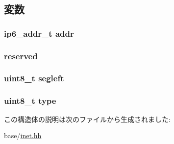 \subsection{変数}
\hypertarget{structNet_1_1ip6__opt__routing__type2_ae32b25ff633168fbdecd8d24293034cd}{
\subsubsection[{addr}]{\setlength{\rightskip}{0pt plus 5cm}ip6\_\-addr\_\-t {\bf addr}}}
\label{structNet_1_1ip6__opt__routing__type2_ae32b25ff633168fbdecd8d24293034cd}
\hypertarget{structNet_1_1ip6__opt__routing__type2_aa43c4c21b173ada1b6b7568956f0d650}{
\subsubsection[{reserved}]{ {\bf reserved}}}
\label{structNet_1_1ip6__opt__routing__type2_aa43c4c21b173ada1b6b7568956f0d650}
\hypertarget{structNet_1_1ip6__opt__routing__type2_adb2cddb552828de64405e671146d80a9}{
\subsubsection[{segleft}]{\setlength{\rightskip}{0pt plus 5cm}uint8\_\-t {\bf segleft}}}
\label{structNet_1_1ip6__opt__routing__type2_adb2cddb552828de64405e671146d80a9}
\hypertarget{structNet_1_1ip6__opt__routing__type2_a1d127017fb298b889f4ba24752d08b8e}{
\subsubsection[{type}]{\setlength{\rightskip}{0pt plus 5cm}uint8\_\-t {\bf type}}}
\label{structNet_1_1ip6__opt__routing__type2_a1d127017fb298b889f4ba24752d08b8e}


この構造体の説明は次のファイルから生成されました:\begin{DoxyCompactItemize}
\item 
base/\hyperlink{inet_8hh}{inet.hh}\end{DoxyCompactItemize}
